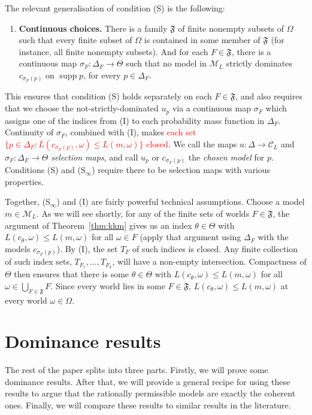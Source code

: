 \documentclass[11pt]{article}
\theoremstyle{definition}
\theoremstyle{remark}
\newcommand{\M}{\mathcal M}
\newcommand{\C}{\mathcal C}
\newcommand{\F}{\mathfrak F}
\newcommand{\supp}{\operatorname{supp}}
\begin{document}
The relevant generalisation of condition (S) is the following:
\begin{enumerate}[label=\textbf{(S$_\infty$)},leftmargin=*]
\item \textbf{Continuous choices.} There is a family $\F$ of finite nonempty subsets of $\Omega$ such that every finite subset of $\Omega$ is contained in some member of $\F$ (for instance, all finite nonempty subsets). And for each $F\in\F$, there is a continuous map $\sigma_F:\Delta_F\to\Theta$ such that no model in $\M_L$ strictly dominates $c_{\sigma_F(p)}$ on $\supp p$, for every $p\in\Delta_F$.
\end{enumerate}

This ensures that condition (S) holds separately on each $F\in\F$, and also requires that we choose the not-strictly-dominated $u_p$ via a continuous map $\sigma_F$ which assigns one of the indices from (I) to each probability mass function in $\Delta_F$. Continuity of $\sigma_F$, combined with (I), makes \textcolor{red}{each set $\{p\in\Delta_F:L(c_{\sigma_F(p)},\omega)\le L(m,\omega)\}$ closed}. We call the maps $u:\Delta\to\C_L$ and $\sigma_F:\Delta_F\to\Theta$ \emph{selection maps}, and call $u_p$ or $c_{\sigma_F(p)}$ the \emph{chosen model} for $p$. Conditions (S) and (S$_\infty$) require there to be selection maps with various properties.

Together, (S$_\infty$) and (I) are fairly powerful technical assumptions. Choose a model $m\in\M_L$. As we will see shortly, for any of the finite sets of worlds $F\in\F$, the argument of Theorem~\ref{thm:kkm} gives us an index $\theta\in\Theta$ with $L(c_\theta,\omega)\le L(m,\omega)$ for all $\omega\in F$ (apply that argument using $\Delta_F$ with the models $c_{\sigma_F(p)}$). By (I), the set $T_F$ of such indices is closed. Any finite collection of such index sets, $T_{F_1},\dots, T_{F_k}$, will have a non-empty intersection. Compactness of $\Theta$ then ensures that there is some $\theta\in\Theta$ with $L(c_\theta,\omega)\le L(m,\omega)$ for all $\omega\in \bigcup_{F\in\F}F$. Since every world lies in some $F\in\F$, $L(c_\theta,\omega)\le L(m,\omega)$ at every world $\omega\in\Omega$.




\section{Dominance results}\label{sec:results}


The rest of the paper splits into three parts. Firstly, we will prove some dominance results. After that, we will provide a general recipe for using these results to argue that the rationally permissible models are exactly the coherent ones. Finally, we will compare these results to similar results in the literature.
\end{document}
